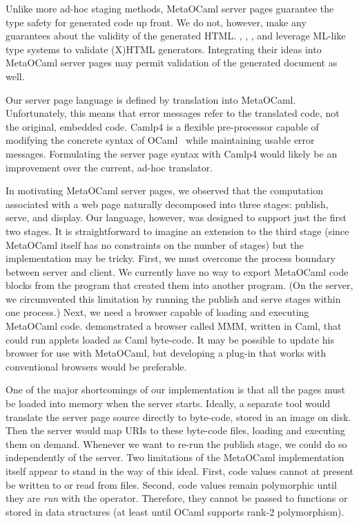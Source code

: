 \documentclass[preprint]{acm_proc_article-sp}
\def\MOC{MetaOCaml\xspace}
\begin{document}
Unlike more ad-hoc staging methods, \MOC server pages guarantee the
type safety for generated code up front.  We do not, however, make any
guarantees about the validity of the generated HTML.
\citet{elsman04typing}, \citet{wallace99haxml}, \citet{hosoya03xduce},
and \citet{ohl04xhtml} leverage ML-like type systems to validate
(X)HTML generators.  Integrating their ideas into \MOC server pages
may permit validation of the generated document as well.

Our server page language is defined by translation into \MOC.
Unfortunately, this means that error messages refer to the translated
code, not the original, embedded code.  Camlp4 is a flexible
pre-processor capable of modifying the concrete syntax of
OCaml~\cite{rauglaudre03camlp4} while maintaining usable error
messages.  Formulating the server page syntax with Camlp4 would likely
be an improvement over the current, ad-hoc translator.

In motivating \MOC server pages, we observed that the computation
associated with a web page naturally decomposed into three stages:
publish, serve, and display.  Our language, however, was designed to
support just the first two stages.  It is straightforward to imagine
an extension to the third stage (since \MOC itself has no constraints
on the number of stages) but the implementation may be tricky.  First,
we must overcome the process boundary between server and client.  We
currently have no way to export \MOC code blocks from the program that
created them into another program.  (On the server, we circumvented
this limitation by running the publish and serve stages within one
process.)  Next, we need a browser capable of loading and executing
\MOC code.  \citet{rouaix96web} demonstrated a browser called MMM,
written in Caml, that could run applets loaded as Caml byte-code.  It
may be possible to update his browser for use with \MOC, but
developing a plug-in that works with conventional browsers would be
preferable.


One of the major shortcomings of our implementation is that all the
pages must be loaded into memory when the server starts.  Ideally, a
separate tool would translate the server page source directly to
byte-code, stored in an image on disk.  Then the server would map URIs
to these byte-code files, loading and executing them on demand.
Whenever we want to re-run the publish stage, we could do so
independently of the server.  Two limitations of the \MOC
implementation itself appear to stand in the way of this ideal.
First, code values cannot at present be written to or read from files.
Second, code values remain polymorphic until they are \emph{run} with
the \Mrun{} operator.  Therefore, they cannot be passed to functions
or stored in data structures (at least until OCaml supports rank-2
polymorphism).
\end{document}
